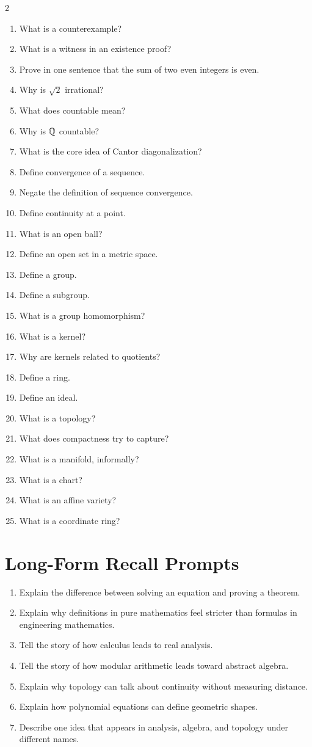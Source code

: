 \documentclass[11pt]{article}
\begin{document}
\begin{multicols}{2}
\begin{enumerate}
\item What is a counterexample?
\item What is a witness in an existence proof?
\item Prove in one sentence that the sum of two even integers is even.
\item Why is $\sqrt2$ irrational?
\item What does countable mean?
\item Why is $\mathbb{Q}$ countable?
\item What is the core idea of Cantor diagonalization?
\item Define convergence of a sequence.
\item Negate the definition of sequence convergence.
\item Define continuity at a point.
\item What is an open ball?
\item Define an open set in a metric space.
\item Define a group.
\item Define a subgroup.
\item What is a group homomorphism?
\item What is a kernel?
\item Why are kernels related to quotients?
\item Define a ring.
\item Define an ideal.
\item What is a topology?
\item What does compactness try to capture?
\item What is a manifold, informally?
\item What is a chart?
\item What is an affine variety?
\item What is a coordinate ring?
\end{enumerate}
\end{multicols}

\section{Long-Form Recall Prompts}

\begin{enumerate}
\item Explain the difference between solving an equation and proving a theorem.
\item Explain why definitions in pure mathematics feel stricter than formulas in engineering mathematics.
\item Tell the story of how calculus leads to real analysis.
\item Tell the story of how modular arithmetic leads toward abstract algebra.
\item Explain why topology can talk about continuity without measuring distance.
\item Explain how polynomial equations can define geometric shapes.
\item Describe one idea that appears in analysis, algebra, and topology under different names.
\end{enumerate}
\end{document}
